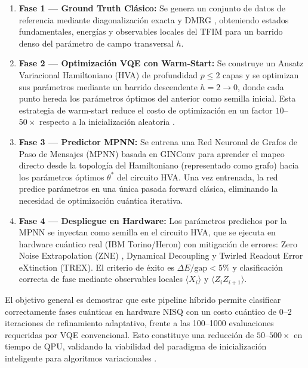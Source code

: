 \documentclass[11pt,a4paper,spanish]{book}
\begin{document}
\begin{enumerate}
    \item \textbf{Fase 1 --- Ground Truth Clásico:} Se genera un conjunto de datos de referencia mediante diagonalización exacta y DMRG \citep{schollwock2011}, obteniendo estados fundamentales, energías y observables locales del TFIM para un barrido denso del parámetro de campo transversal $h$.

    \item \textbf{Fase 2 --- Optimización VQE con Warm-Start:} Se construye un Ansatz Variacional Hamiltoniano (HVA) de profundidad $p \leq 2$ capas \citep{wiersema2020} y se optimizan sus parámetros mediante un barrido descendente $h = 2 \to 0$, donde cada punto hereda los parámetros óptimos del anterior como semilla inicial. Esta estrategia de warm-start reduce el costo de optimización en un factor $10$--$50\times$ respecto a la inicialización aleatoria \citep{puig2025, mele2022}.

    \item \textbf{Fase 3 --- Predictor MPNN:} Se entrena una Red Neuronal de Grafos de Paso de Mensajes (MPNN) basada en GINConv \citep{xu2019} para aprender el mapeo directo desde la topología del Hamiltoniano (representado como grafo) hacia los parámetros óptimos $\theta^*$ del circuito HVA. Una vez entrenada, la red predice parámetros en una única pasada forward clásica, eliminando la necesidad de optimización cuántica iterativa.

    \item \textbf{Fase 4 --- Despliegue en Hardware:} Los parámetros predichos por la MPNN se inyectan como semilla en el circuito HVA, que se ejecuta en hardware cuántico real (IBM Torino/Heron) con mitigación de errores: Zero Noise Extrapolation (ZNE) \citep{uvarov2024}, Dynamical Decoupling \citep{pokharel2025} y Twirled Readout Error eXtinction (TREX). El criterio de éxito es $\Delta E / \text{gap} < 5\%$ y clasificación correcta de fase mediante observables locales $\langle X_i \rangle$ y $\langle Z_i Z_{i+1} \rangle$.
\end{enumerate}

El objetivo general es demostrar que este pipeline híbrido permite clasificar correctamente fases cuánticas en hardware NISQ con un costo cuántico de 0--2 iteraciones de refinamiento adaptativo, frente a las 100--1000 evaluaciones requeridas por VQE convencional. Esto constituye una reducción de $50$--$500\times$ en tiempo de QPU, validando la viabilidad del paradigma de inicialización inteligente para algoritmos variacionales \citep{zhang2025, miao2024}.
\end{document}
